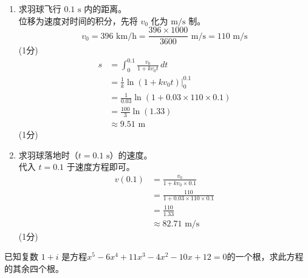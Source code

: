 \documentclass[12pt,a4paper]{exam-zh}
\newcommand{\qscoreoffset}{4em}
\newcommand{\qscore}[1]{%
    \leavevmode\unskip\nobreak\hfill
    \makebox[0pt][l]{\makebox[\qscoreoffset][r]{(#1\%)}}%
}
\begin{document}
\begin{solution}
    \begin{enumerate}[label=(\alph*)]
        \item 求羽球飞行 $0.1\text{ s}$ 内的距离。 \\
        位移为速度对时间的积分，先将 $v_0$ 化为 $\text{m/s}$ 制。
        \[
            v_0 = 396\text{ km/h} = \frac{396 \times 1000}{3600}\text{ m/s} = 110\text{ m/s}
        \]
        \hfill (1分)
        \begin{align*}
            s &= \int_0^{0.1} \frac{v_0}{1+kv_0t}\,dt \\
            &= \frac{1}{k}\ln(1+kv_0t)\Big|_0^{0.1} \\
            &= \frac{1}{0.03}\ln(1+0.03\times110\times0.1) \\
            &= \frac{100}{3}\ln(1.33) \\
            &\approx 9.51\text{ m}
        \end{align*}
        \hfill (1分)

        \item 求羽球落地时（$t=0.1\text{ s}$）的速度。 \\
        代入 $t=0.1$ 于速度方程即可。
        \begin{align*}
            v(0.1) &= \frac{v_0}{1+kv_0\times0.1} \\
            &= \frac{110}{1+0.03\times110\times0.1} \\
            &= \frac{110}{1.33} \\
            &\approx 82.71\text{ m/s}
        \end{align*}
        \hfill (1分)
    \end{enumerate}
\end{solution}

\begin{question}[points = 6]
    已知复数 $1+i$ 是方程$x^5 - 6x^4 + 11x^3 - 4x^2 - 10x + 12 = 0$的一个根，求此方程的其余四个根。 \qscore{6}
\end{question}
\end{document}
